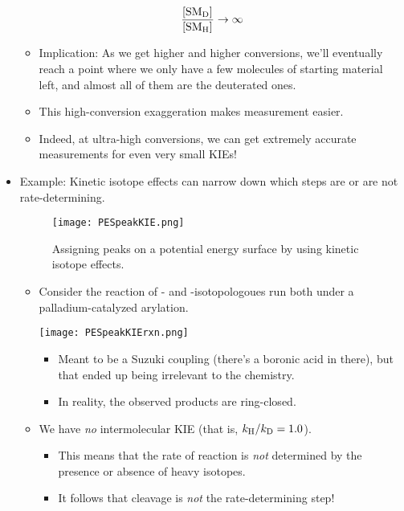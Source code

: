 \documentclass[../notes.tex]{subfiles}
\begin{document}
\begin{itemize}
\begin{equation*}
        \frac{\cnc{SM_D}}{\cnc{SM_H}} \to \infty
    \end{equation*}
    \begin{itemize}
        \item Implication: As we get higher and higher conversions, we'll eventually reach a point where we only have a few molecules of starting material left, and almost all of them are the deuterated ones.
        \item This high-conversion exaggeration makes measurement easier.
        \item Indeed, at ultra-high conversions, we can get extremely accurate measurements for even very small KIEs!
    \end{itemize}
    \pagebreak
    \item Example: Kinetic isotope effects can narrow down which steps are or are not rate-determining.
    \begin{figure}[h!]
        \centering
        \texttt{[image: PESpeakKIE.png]}
        \caption{Assigning peaks on a potential energy surface by using kinetic isotope effects.}
        \label{fig:PESpeakKIE}
    \end{figure}
    \begin{itemize}
        \item Consider the reaction of - and -isotopologoues run both under a palladium-catalyzed arylation.
        \begin{center}
            \texttt{[image: PESpeakKIErxn.png]}
        \end{center}
        \begin{itemize}
            \item Meant to be a Suzuki coupling (there's a boronic acid in there), but that ended up being irrelevant to the chemistry.
            \item In reality, the observed products are ring-closed.
        \end{itemize}
        \item We have \emph{no} intermolecular KIE (that is, $k_{\ce{H}}/k_{\ce{D}}=1.0$).
        \begin{itemize}
            \item This means that the rate of reaction is \emph{not} determined by the presence or absence of heavy isotopes.
            \item It follows that  cleavage is \emph{not} the rate-determining step!

\end{itemize}
\end{itemize}
\end{itemize}
\end{document}
